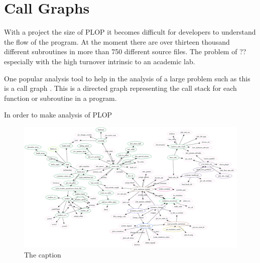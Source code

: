 \section{Call Graphs}
\label{section:unsorted/call_graphs}

With a project the size of PLOP it becomes difficult for developers to understand the flow of the program.
At the moment there are over thirteen thousand different subroutines in more than 750 different source files.
The problem of ?? especially with the high turnover intrinsic to an academic lab.


One popular analysis tool to help in the analysis of a large problem such as this is a call graph \cite{graham1982gprof}.
This is a directed graph representing the call stack for each function or subroutine in a program.

In order to make analysis of PLOP 


\begin{figure}[h]
    \centering
    \includegraphics[width=1.0\textwidth,height=0.9\textheight,keepaspectratio]{figures/plop_connected_sfdp.png}
    \caption{The caption}
    \label{figure:mutation_call_graph}
\end{figure}

